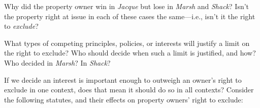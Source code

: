 
\item Why did the property owner win in \textit{Jacque} but lose in
\textit{Marsh} and \textit{Shack}? Isn't the property right at issue in each of
these cases the same---i.e., isn't it the right to \textit{exclude}?

\item What types of competing principles, policies, or interests will justify a
limit on the right to exclude? Who should decide when such a limit is
justified, and how? Who decided in \textit{Marsh}? In \textit{Shack}?

\item If we decide an interest is important enough to outweigh an owner's right
to exclude in one context, does that mean it should do so in all contexts?
Consider the following statutes, and their effects on property owners' right to
exclude:


